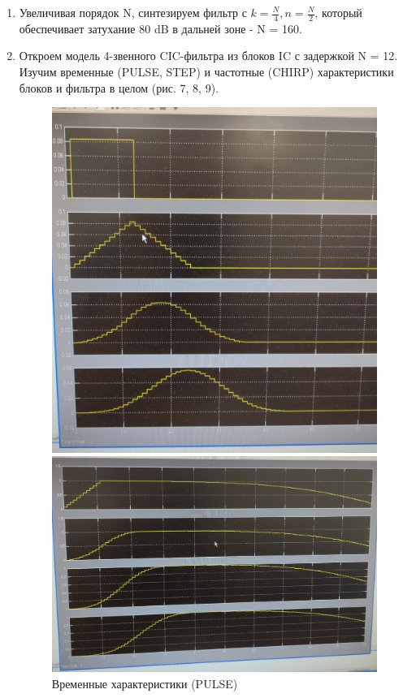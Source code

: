 \documentclass[a4paper, 12pt]{article}%
\begin{document}
\begin{enumerate}
\item Увеличивая порядок N, синтезируем фильтр с $k = \frac{N}{4}, n = \frac{N}{2}$, который обеспечивает затухание 80 dB в дальней зоне - N = 160.

\item Откроем модель 4-звенного CIC-фильтра из блоков IC с задержкой N = 12. Изучим временные (PULSE, STEP) и частотные (CHIRP) характеристики блоков и фильтра в целом (рис. 7, 8, 9).

\begin{figure}[h!]
        \begin{center}
            \begin{minipage}[h!]{0.32\linewidth}
                \includegraphics[width=1\linewidth]{images/3.7_1.jpg}
                \caption{Временные характеристики (PULSE)}
                \label{3.7_1}
            \end{minipage}
            \hfill
            \begin{minipage}[h!]{0.32\linewidth}
                \includegraphics[width=1\linewidth]{images/3.7_2.jpg}

\end{minipage}
\end{center}
\end{figure}
\end{enumerate}
\end{document}
